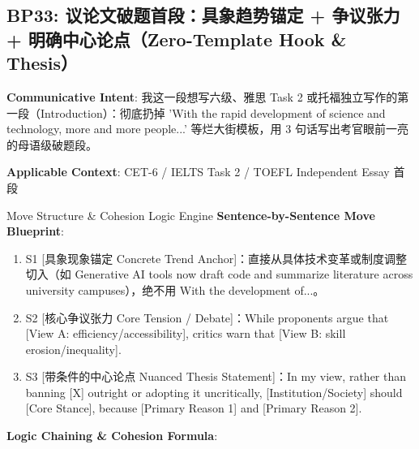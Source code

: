 \subsection{BP33: 议论文破题首段：具象趋势锚定 + 争议张力 + 明确中心论点（Zero-Template Hook \& Thesis）}\label{sec:bp:BP33}
\noindent\textbf{\color{AcadNavy}Communicative Intent}: 我这一段想写六级、雅思 Task 2 或托福独立写作的第一段（Introduction）：彻底扔掉 'With the rapid development of science and technology, more and more people...' 等烂大街模板，用 3 句话写出考官眼前一亮的母语级破题段。\par\vspace{2pt}
\noindent\textbf{\color{AcadSlate}Applicable Context}: CET-6 / IELTS Task 2 / TOEFL Independent Essay 首段\par\vspace{4pt}
\begin{ConceptBox}{Move Structure \& Cohesion Logic Engine}
\textbf{Sentence-by-Sentence Move Blueprint}:
\begin{enumerate}[label=\textbf{\color{AcadNavy}S\arabic*.}, leftmargin=2em, itemsep=2pt]
  \item S1 [具象现象锚定 Concrete Trend Anchor]：直接从具体技术变革或制度调整切入（如 Generative AI tools now draft code and summarize literature across university campuses），绝不用 With the development of...。
  \item S2 [核心争议张力 Core Tension / Debate]：While proponents argue that [View A: efficiency/accessibility], critics warn that [View B: skill erosion/inequality].
  \item S3 [带条件的中心论点 Nuanced Thesis Statement]：In my view, rather than banning [X] outright or adopting it uncritically, [Institution/Society] should [Core Stance], because [Primary Reason 1] and [Primary Reason 2].
\end{enumerate}\par\vspace{4pt}
\textbf{Logic Chaining \& Cohesion Formula}:\par{}
\end{ConceptBox}
